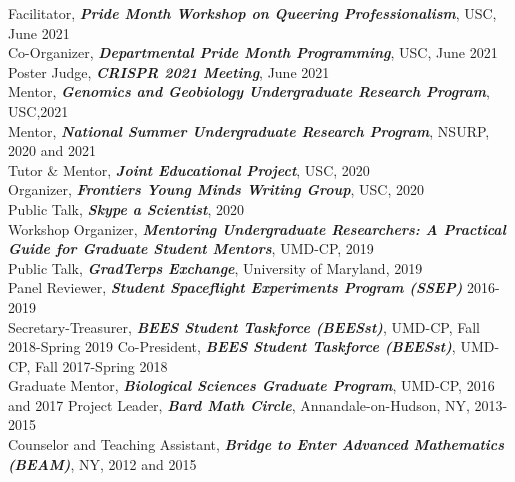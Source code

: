 \documentclass[]{res}
\begin{document}
\begin{resume}
{Facilitator,} \emph{\bf Pride Month Workshop on Queering Professionalism}, USC, June 2021\\
{Co-Organizer,} \emph{\bf Departmental Pride Month Programming}, USC, June 2021\\
{Poster Judge,} \emph{\bf CRISPR 2021 Meeting}, June 2021\\
{Mentor,} \emph{\bf Genomics and Geobiology Undergraduate Research Program}, USC,2021\\
{Mentor,} \emph{\bf National Summer Undergraduate Research Program}, NSURP, 2020 and 2021\\
{Tutor \& Mentor,} \emph{\bf Joint Educational Project}, USC, 2020\\
{Organizer,} \emph{\bf Frontiers Young Minds Writing Group}, USC, 2020\\
{Public Talk,} \emph{\bf Skype a Scientist}, 2020\\
{Workshop Organizer,} \emph{\bf Mentoring Undergraduate Researchers: A Practical Guide for Graduate Student Mentors}, UMD-CP, 2019\\
{Public Talk,} \emph{\bf GradTerps Exchange}, University of Maryland, 2019\\
{Panel Reviewer,} \emph{\bf Student Spaceflight Experiments Program (SSEP)} 2016-2019\\
{Secretary-Treasurer,} \emph{\bf BEES Student Taskforce (BEESst)}, UMD-CP, Fall 2018-Spring 2019 %
{Co-President,} \emph{\bf BEES Student Taskforce (BEESst)}, UMD-CP, Fall 2017-Spring 2018\\
{Graduate Mentor,} \emph{\bf Biological Sciences Graduate Program}, UMD-CP, 2016 and 2017 %
{Project Leader,} \emph{\bf Bard Math Circle}, Annandale-on-Hudson, NY, 2013-2015 \\
{Counselor and Teaching Assistant,} \emph{\bf Bridge to Enter Advanced Mathematics (BEAM)}, NY, 2012 and 2015


\end{resume}
\end{document}
